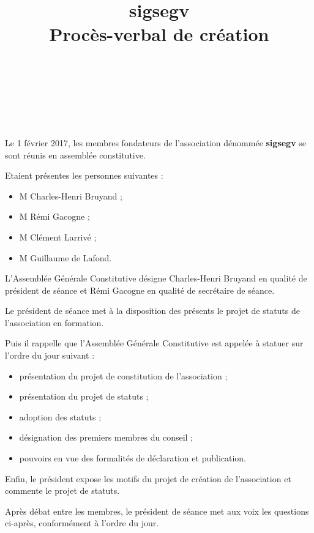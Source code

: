 \documentclass[a4paper,oneside,12pt]{article}
\begin{document}
\title{sigsegv \\{\huge Procès-verbal de création}}

{ \\
}

{\\
}

\section*{}

Le 1 février 2017, les membres fondateurs de l'association dénommée \textbf {sigsegv} se sont réunis en assemblée constitutive.

Etaient présentes les personnes suivantes :

\begin{itemize}
\item M Charles-Henri Bruyand ;
\item M Rémi Gacogne ;
\item M Clément Larrivé ;
\item M Guillaume de Lafond.
\end{itemize}

L’Assemblée Générale Constitutive désigne Charles-Henri Bruyand en qualité de président de séance et Rémi Gacogne en qualité de secrétaire de séance.

Le président de séance met à la disposition des présents le projet de statuts de l’association en formation.

Puis il rappelle que l’Assemblée Générale Constitutive est appelée à statuer sur l’ordre du jour suivant :

\begin{itemize}
\item présentation du projet de constitution de l’association ;
\item présentation du projet de statuts ;
\item adoption des statuts ;
\item désignation des premiers membres du conseil ;
\item pouvoirs en vue des formalités de déclaration et publication.
\end{itemize}

Enfin, le président expose les motifs du projet de création de l’association et commente le projet de statuts.

Après débat entre les membres, le président de séance met aux voix les questions ci-après, conformément à l'ordre du jour.
\end{document}
